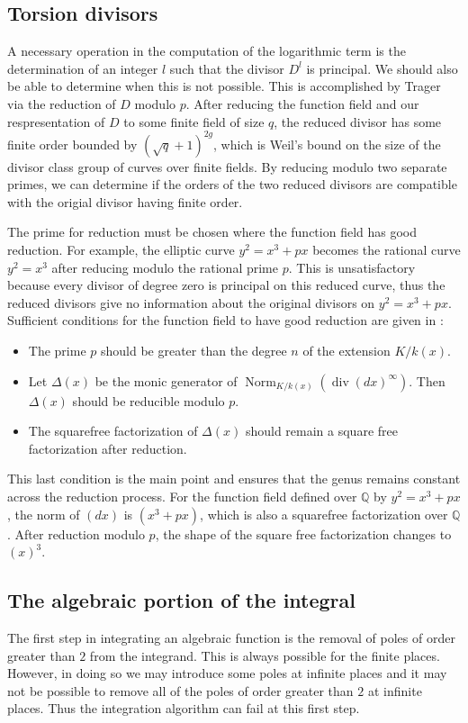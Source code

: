 \documentclass[12pt,reqno]{amsart}
\numberwithin{equation}{section}
\newcommand{\op}[1]  { \operatorname{ #1 }}
\begin{document}
\subsection{Torsion divisors}
A necessary operation in the computation of the logarithmic term is the determination of an integer $l$ such that the divisor $D^l$ is principal. We should also be able to determine when this is not possible. This is accomplished by Trager via the reduction of $D$ modulo $p$. After reducing the function field and our respresentation of $D$ to some finite field of size $q$, the reduced divisor has some finite order bounded by $(\sqrt{q}+1)^{2g}$, which is Weil's bound \cite{weil} on the size of the divisor class group of curves over finite fields. By reducing modulo two separate primes, we can determine if the orders of the two reduced divisors are compatible with the origial divisor having finite order.

The prime for reduction must be chosen where the function field has good reduction. For example, the elliptic curve $y^2=x^3+p x$ becomes the rational curve $y^2=x^3$ after reducing modulo the rational prime $p$. This is unsatisfactory because every divisor of degree zero is principal on this reduced curve, thus the reduced divisors give no information about the original divisors on $y^2=x^3+p x$. Sufficient conditions for the function field to have good reduction are given in \cite{goodred}:
\begin{itemize}
\item The prime $p$ should be greater than the degree $n$ of the extension $K/k(x)$.
\item Let $\Delta(x)$ be the monic generator of $\op{Norm}_{K/k(x)}(\op{div}(dx)^{\infty})$. Then $\Delta(x)$ should be reducible modulo $p$.
\item The squarefree factorization of $\Delta(x)$ should remain a square free factorization after reduction.
\end{itemize}
This last condition is the main point and ensures that the genus remains constant across the reduction process. For the function field defined over $\mathbb{Q}$ by $y^2=x^3+p x$, the norm of $(dx)$ is $(x^3+p x)$, which is also a squarefree factorization over $\mathbb{Q}$. After reduction modulo $p$, the shape of the square free factorization changes to $(x)^3$.



\subsection{The algebraic portion of the integral}
The first step in integrating an algebraic function is the removal of poles of order greater than $2$ from the integrand. This is always possible for the finite places. However, in doing so we may introduce some poles at infinite places and it may not be possible to remove all of the poles of order greater than $2$ at infinite places. Thus the integration algorithm can fail at this first step.
\end{document}
